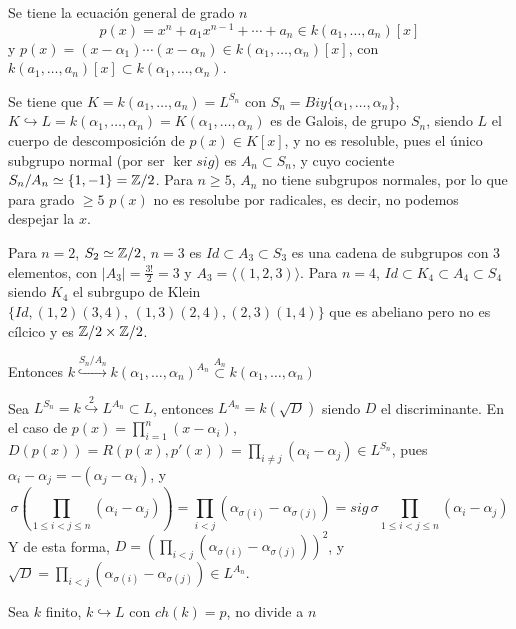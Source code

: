     \begin{defi}
        Se tiene la ecuaci\'on general de grado $n$
        $$p(x) = x^n + a_1 x^{n-1} + \cdots  + a_n \in k(a_1, \ldots, a_n)[x]$$
        y $p(x) = (x-\alpha_1) \cdots (x-\alpha_n) \in k(\alpha_1, \ldots, \alpha_n)[x]$, con $k(a_1, \ldots, a_n)[x] \subset  k(\alpha_1, \ldots, \alpha_n)$. 

        Se tiene que $K = k(a_1, \ldots, a_n) = L^{S_n}$ con $S_n = Biy\{\alpha_1, \ldots, \alpha_n\}$, $K \hookrightarrow L=  k(\alpha_1, \ldots, \alpha_n) = K (\alpha_1, \ldots, \alpha_n)$ es de Galois, de grupo $S_n$, siendo $L$ el cuerpo de descomposici\'on de $p(x) \in K[x]$, y no es resoluble, pues el \'unico subgrupo normal (por ser $\ker sig$) es $A_n \subset S_n$, y cuyo cociente $S_n / A_n \simeq \{1,-1\} = \mathbb{Z}/2$. Para $n \ge 5$, $A_n$ no tiene subgrupos normales, por lo que para grado $\ge 5$ $p(x)$ no es resolube por radicales, es decir, no podemos despejar la $x$. 

        Para $n =2$, $S_2 \simeq \mathbb{Z} / 2$, $n=3$ es $Id \subset A_3 \subset S_3$ es una cadena de subgrupos con 3 elementos, con $|A_3| =\frac{3!}{2} = 3$ y $A_3 = \langle (1,2,3)\rangle$. Para $n=4$, $Id\subset K_4 \subset A_4 \subset S_4$ siendo $K_4$ el subrgupo de Klein $\{Id, (1,2)(3,4), \, (1,3)(2,4), (2,3)(1,4)\}$ que es abeliano pero no es c\'ilcico y es $\mathbb{Z}/2 \times \mathbb{Z}/2$. 

        Entonces $k \overset{S_n/A_n}{\hookrightarrow} k(\alpha_1, \ldots, \alpha_n)^{A_n} \overset{A_n}{\subset} k(\alpha_1, \ldots, \alpha_n)$
    \end{defi}
\begin{obs}
    Sea $ L^{S_n}= k \overset{2}{\hookrightarrow} L^{A_n} \subset L$, entonces $L^{A_n} = k(\sqrt{D})$ siendo $D$ el discriminante. En el caso de $p(x) = \prod_{i=1}^n (x-\alpha_i) $, $D(p(x)) = R(p(x), p'(x)) = \prod_{i\neq j}(\alpha_i - \alpha_j) \in L^{S_n}$, pues $\alpha_i - \alpha_j = -(\alpha_j - \alpha_i)$, y 
    $$\sigma\left( \prod_{1\le i < j \le n}(\alpha_i - \alpha_j) \right) = \prod_{i < j} (\alpha_{\sigma(i)} - \alpha_{\sigma(j)}) = sig \,\sigma \prod_{1\le i < j \le n}(\alpha_i - \alpha_j)  $$
    Y de esta forma, $\displaystyle D = \left( \prod_{i < j} (\alpha_{\sigma(i)} - \alpha_{\sigma(j)}) \right)^2$, y $\sqrt{D} = \prod_{i < j} (\alpha_{\sigma(i)} - \alpha_{\sigma(j)}) \in L^{A_n}$.
\end{obs}
\begin{obs}
    Sea $k$ finito, $k \hookrightarrow L$ con $ch(k)= p$, no divide a $n$
\end{obs}
